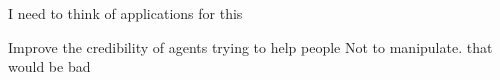 I need to think of applications for this

Improve the credibility of agents trying to help people 
Not to manipulate. that would be bad